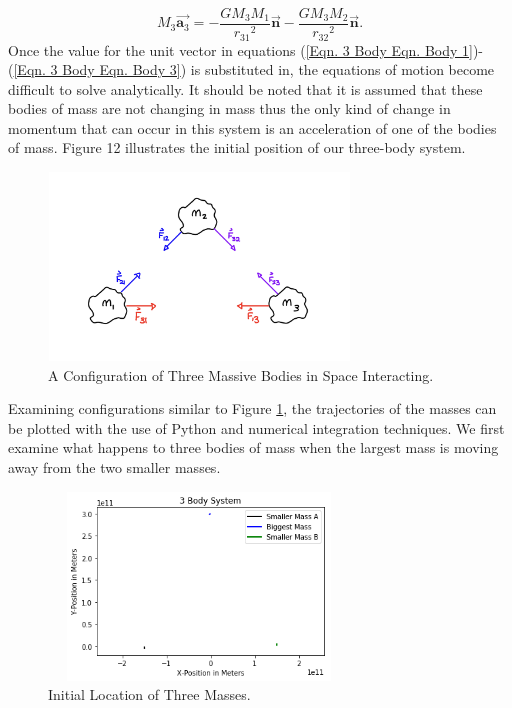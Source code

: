 \documentclass[twocolumn]{article}
\begin{document}
\begin{equation}\label{Eqn. 3 Body Eqn. Body 3}
M_3 \Vec{\textbf{a}_3}=-\frac{GM_3M_1}{{r_{31}}^2}{\Vec{\textbf{n}}}-\frac{GM_3M_2}{{r_{32}}^2}{\Vec{\textbf{n}}}.  
\end{equation}
Once the value for the unit vector in equations (\ref{Eqn. 3 Body Eqn. Body 1})-(\ref{Eqn. 3 Body Eqn. Body 3}) is substituted in, the equations of motion become difficult to solve analytically. It should be noted that it is assumed that these bodies of mass are not changing in mass thus the only kind of change in momentum that can occur in this system is an acceleration of one of the bodies of mass.
Figure 12 illustrates the initial position of our three-body system.
\begin{figure}[ht]
    \centering
    \includegraphics[width=8cm, height=5cm]{Figures/3-Body Cartoon (1).png}
    \caption{\small{A Configuration of Three Massive Bodies in Space Interacting.}}
    \label{Fig. 3-Body Cartoon Fig. 1}
\end{figure}
\par \noindent
Examining configurations similar to Figure \ref{Fig. 3-Body Cartoon Fig. 1}, the trajectories of the masses can be plotted with the use of Python and numerical integration techniques. We first examine what happens to three bodies of mass when the largest mass is moving away from the two smaller masses.
\newpage
\begin{figure}[ht]
    \centering
    \includegraphics[width=8cm, height=5cm]{Figures/3-Body Dynamics (1).png}
    \caption{\small{Initial Location of Three Masses.}}
    \label{Fig. 3-Body Dynamics Fig. 1}
\end{figure}
\end{document}
